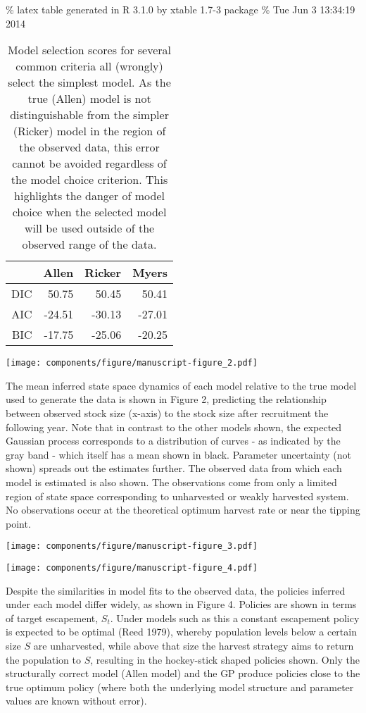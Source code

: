 \documentclass[]{components/elsarticle}
\begin{document}
\% latex table generated in R 3.1.0 by xtable 1.7-3 package \% Tue Jun 3
13:34:19 2014

\begin{table}[ht]
\centering
\begin{tabular}{rrrr}
  \hline
 & Allen & Ricker & Myers \\ 
  \hline
DIC & 50.75 & 50.45 & 50.41 \\ 
  AIC & -24.51 & -30.13 & -27.01 \\ 
  BIC & -17.75 & -25.06 & -20.25 \\ 
   \hline
\end{tabular}
\caption{Model selection scores for several common criteria all (wrongly) select the simplest model. As the true (Allen) model is not distinguishable from the simpler (Ricker) model in the region of the observed data, this error cannot be avoided regardless of the model choice criterion. This highlights the danger of model choice when the selected model will be used outside of the observed range of the data.} 
\end{table}

\texttt{[image: components/figure/manuscript-figure\_2.pdf]}

The mean inferred state space dynamics of each model relative to the
true model used to generate the data is shown in Figure 2, predicting
the relationship between observed stock size (x-axis) to the stock size
after recruitment the following year. Note that in contrast to the other
models shown, the expected Gaussian process corresponds to a
distribution of curves - as indicated by the gray band - which itself
has a mean shown in black. Parameter uncertainty (not shown) spreads out
the estimates further. The observed data from which each model is
estimated is also shown. The observations come from only a limited
region of state space corresponding to unharvested or weakly harvested
system. No observations occur at the theoretical optimum harvest rate or
near the tipping point.

\texttt{[image: components/figure/manuscript-figure\_3.pdf]}

\texttt{[image: components/figure/manuscript-figure\_4.pdf]}

Despite the similarities in model fits to the observed data, the
policies inferred under each model differ widely, as shown in Figure 4.
Policies are shown in terms of target escapement, $S_t$. Under models
such as this a constant escapement policy is expected to be optimal
(Reed 1979), whereby population levels below a certain size $S$ are
unharvested, while above that size the harvest strategy aims to return
the population to $S$, resulting in the hockey-stick shaped policies
shown. Only the structurally correct model (Allen model) and the GP
produce policies close to the true optimum policy (where both the
underlying model structure and parameter values are known without
error).
\end{document}
